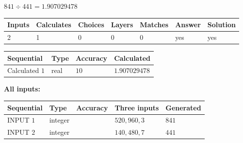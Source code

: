 \documentclass{ctexart}
\begin{document}
 

$ %
841 \div  %
441=   %
1.907029478$
 
 
\noindent{}
 
 

 
   
   
   
   
\noindent\begin{tabular}{|l|l|l|l|l|l|l|}
 \hline
Inputs & Calculates & Choices & Layers & Matches & Answer & Solution \\ \hline
 2  & 
 1  & 
 0
  & 
 0  & 
 0  & 
  yes & 
  yes 
  \\ \hline
 \end{tabular}
   
   
   
   
\noindent{}
   
   
  
  
\noindent\begin{tabular}{|l|l|l|l|}
\hline
 Sequential & Type & Accuracy & Calculated \\ 
\hline
 
 
  Calculated $  1 $ & real & $  10  $ & 
 $ 1.907029478 $ 
 \\  \hline  
 \end{tabular}
   
   
   
   
\noindent\vspace{0.1in}\hspace{-0.08in} {\textbf{\Large{All inputs: }}}
   
   
  
  
\noindent\begin{tabular}{|l|l|l|l|l|}
\hline
 Sequential & Type & Accuracy & Three inputs & Generated \\ 
\hline
 
 
  INPUT $  1 $ & integer &  & $
 520
 , 
 960
 , 
 3
 $ & $ 841 $ 
 \\  \hline  
 
 
  INPUT $  2 $ & integer &  & $
 140
 , 
 480
 , 
 7
 $ & $ 441 $ 
 \\  \hline  
 \end{tabular}
   
   
  
\vspace{0.2in}
  
\end{document}
